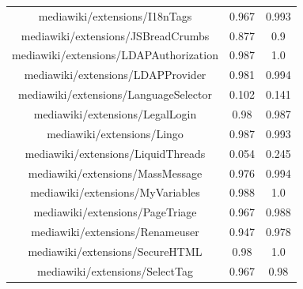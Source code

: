 \begin{table}[H]
\begin{tabular}{@{}c c c@{}}
mediawiki/extensions/I18nTags & 0.967 & 0.993 \\
mediawiki/extensions/JSBreadCrumbs & 0.877 & 0.9 \\
mediawiki/extensions/LDAPAuthorization & 0.987 & 1.0 \\
mediawiki/extensions/LDAPProvider & 0.981 & 0.994 \\
mediawiki/extensions/LanguageSelector & 0.102 & 0.141 \\
mediawiki/extensions/LegalLogin & 0.98 & 0.987 \\
mediawiki/extensions/Lingo & 0.987 & 0.993 \\
mediawiki/extensions/LiquidThreads & 0.054 & 0.245 \\
mediawiki/extensions/MassMessage & 0.976 & 0.994 \\
mediawiki/extensions/MyVariables & 0.988 & 1.0 \\
mediawiki/extensions/PageTriage & 0.967 & 0.988 \\
mediawiki/extensions/Renameuser & 0.947 & 0.978 \\
mediawiki/extensions/SecureHTML & 0.98 & 1.0 \\
mediawiki/extensions/SelectTag & 0.967 & 0.98 \\
    \hline
\end{tabular}
    \label{table:accuracy-score-merged-appendix-c-part-3}
\end{table}


